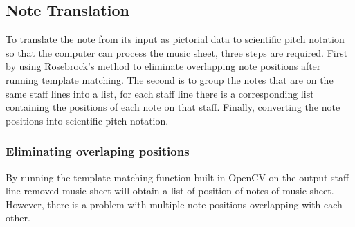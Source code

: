 \documentclass[final]{cvpr}
\begin{document}

\subsection{Note Translation}

To translate the note from its input as pictorial data to scientific pitch
notation so that the computer can process the music sheet, three steps are
required. First by using Rosebrock's method \cite{Rosebrock} to eliminate overlapping
note positions after running template matching. The second is to group the
notes that are on the same staff lines into a list, for each staff line there is
a corresponding list containing the positions of each note on that staff.
Finally, converting the note positions into scientific pitch notation.

\subsubsection{Eliminating overlaping positions}
By running the template matching function built-in OpenCV on the output staff
line removed music sheet will obtain a list of position of notes of music sheet.
However, there is a problem with multiple note positions overlapping with each
other.
\end{document}
